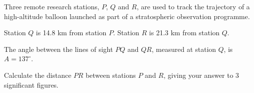 \begin{question}
\noindent Three remote research stations, $P$, $Q$ and $R$, are used to track the trajectory of a high-altitude balloon launched as part of a stratospheric observation programme.

Station $Q$ is 14.8 km from station $P$. Station $R$ is 21.3 km from station $Q$.

The angle between the lines of sight $PQ$ and $QR$, measured at station $Q$, is $A = 137^\circ$.

Calculate the distance $PR$ between stations $P$ and $R$, giving your answer to 3 significant figures.

\vspace{4.5cm}

\begin{flushright}
\end{flushright}
\end{question}
